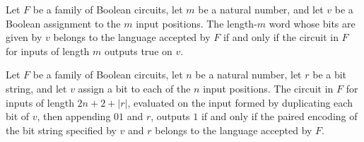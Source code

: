 \begin{theorem}
\label{BoolCircuit.DAGCircuitFamily.mem_language_ofFn}
\leanok
{}
Let $F$ be a family of Boolean circuits, let $m$ be a natural number, and let $v$ be a
Boolean assignment to the $m$ input positions. The length-$m$ word whose bits are given
by $v$ belongs to the language accepted by $F$ if and only if the circuit in $F$ for
inputs of length $m$ outputs true on $v$.
\end{theorem}

\begin{theorem}
\label{BoolCircuit.DAGCircuitFamily.pairEncode_eval_eq_true_iff}
\leanok
{}
Let $F$ be a family of Boolean circuits, let $n$ be a natural number, let $r$ be a bit
string, and let $v$ assign a bit to each of the $n$ input positions. The circuit in $F$
for inputs of length $2n+2+|r|$, evaluated on the input formed by duplicating each bit
of $v$, then appending $01$ and $r$, outputs $1$ if and only if the paired encoding of
the bit string specified by $v$ and $r$ belongs to the language accepted by $F$.
\end{theorem}
